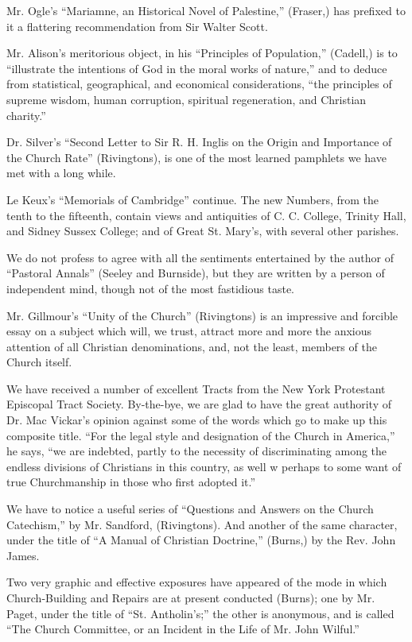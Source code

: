 Mr. Ogle's ``Mariamne, an Historical Novel of
Palestine,'' (Fraser,) has prefixed to it a flattering recommendation
from Sir Walter Scott.

Mr. Alison's meritorious object, in his ``Principles
of Population,'' (Cadell,) is to ``illustrate the intentions of God in the
moral works of nature,'' and to deduce from statistical, geographical,
and economical considerations, ``the principles of supreme wisdom, human
corruption, spiritual regeneration, and Christian charity.''

Dr. Silver's ``Second Letter to Sir R. H. Inglis on
the Origin and Importance of the Church Rate'' (Rivingtons), is one of
the most learned pamphlets we have met with a long while.

Le Keux's ``Memorials of Cambridge'' continue. The
new Numbers, from the tenth to the fifteenth, contain views and
antiquities of C. C. College, Trinity Hall, and Sidney Sussex College;
and of Great St. Mary's, with several other parishes.

We do not profess to agree with all the sentiments
entertained by the author of ``Pastoral Annals'' (Seeley and Burnside),
but they are written by a person of independent mind, though not of the
most fastidious taste.

Mr. Gillmour's ``Unity of the Church'' (Rivingtons)
is an impressive and forcible essay on a subject which will, we trust,
attract more and more the anxious attention of all Christian
denominations, and, not the least, members of the Church itself.

We have received a number of excellent Tracts from
the New York Protestant Episcopal Tract Society. By-the-bye, we are glad
to have the great authority of Dr. Mac Vickar's opinion against some of
the words which go to make up this composite title. ``For the legal style
and designation of the Church in America,'' he says, ``we are indebted,
partly to the necessity of discriminating among the endless divisions of
Christians in this country, as well w perhaps to some want of true
Churchmanship in those who first adopted it.''

We have to notice a useful series of ``Questions and
Answers on the Church Catechism,'' by Mr. Sandford, (Rivingtons). And
another of the same character, under the title of ``A Manual of Christian
Doctrine,'' (Burns,) by the Rev. John James.

Two very graphic and effective exposures have
appeared of the mode in which Church-Building and Repairs are at present
conducted (Burns); one by Mr. Paget, under the title of ``St. Antholin's;''
the other is anonymous, and is called ``The Church Committee, or an
Incident in the Life of Mr. John Wilful.''

